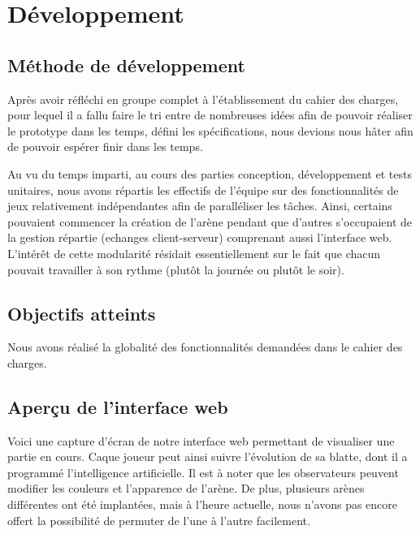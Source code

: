 \chapter{Développement}
\thispagestyle{fancy}

    \section{Méthode de développement}
            
        Après avoir réfléchi en groupe complet à l'établissement du cahier des charges, pour lequel il a fallu faire le tri entre de nombreuses idées afin de pouvoir réaliser le prototype dans les temps, défini les spécifications, nous devions nous hâter afin de pouvoir espérer finir dans les temps.

        Au vu du temps imparti, au cours des parties conception, développement et tests unitaires, nous avons répartis les effectifs de l'équipe sur des fonctionnalités de jeux relativement indépendantes afin de paralléliser les tâches. Ainsi, certains pouvaient commencer la création de l'arène pendant que d'autres s'occupaient de la gestion répartie (echanges client-serveur) comprenant aussi l'interface web. L'intérêt de cette modularité résidait essentiellement sur le fait que chacun pouvait travailler à son rythme (plutôt la journée ou plutôt le soir). 

    \section{Objectifs atteints}
            
        Nous avons réalisé la globalité des fonctionnalités demandées dans le cahier des charges.  
            
    
    
    
    \section{Aperçu de l'interface web}
    
    Voici une capture d'écran de notre interface web permettant de visualiser une partie en cours. Caque joueur peut ainsi suivre l'évolution de sa blatte, dont il a programmé l'intelligence artificielle. Il est à noter que les observateurs peuvent modifier les couleurs et l'apparence de l'arène.
    De plus, plusieurs arènes différentes ont été implantées, mais à l'heure actuelle, nous n'avons pas encore offert la possibilité de permuter de l'une à l'autre facilement.

